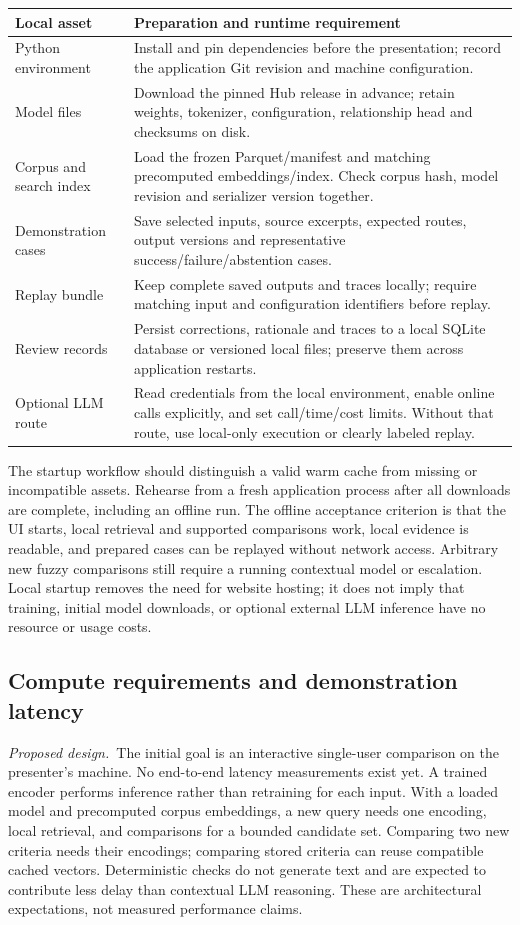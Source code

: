 \documentclass[10pt,letterpaper]{article}
\newcommand{\planned}{\textit{Proposed design.}}
\begin{document}
\begin{longtable}{L{.25\linewidth}L{.66\linewidth}}
\toprule Local asset & Preparation and runtime requirement\\\midrule
\endhead
Python environment & Install and pin dependencies before the presentation; record the application Git revision and machine configuration.\\
Model files & Download the pinned Hub release in advance; retain weights, tokenizer, configuration, relationship head and checksums on disk.\\
Corpus and search index & Load the frozen Parquet/manifest and matching precomputed embeddings/index. Check corpus hash, model revision and serializer version together.\\
Demonstration cases & Save selected inputs, source excerpts, expected routes, output versions and representative success/failure/abstention cases.\\
Replay bundle & Keep complete saved outputs and traces locally; require matching input and configuration identifiers before replay.\\
Review records & Persist corrections, rationale and traces to a local SQLite database or versioned local files; preserve them across application restarts.\\
Optional LLM route & Read credentials from the local environment, enable online calls explicitly, and set call/time/cost limits. Without that route, use local-only execution or clearly labeled replay.\\\bottomrule
\end{longtable}

The startup workflow should distinguish a valid warm cache from missing or
incompatible assets. Rehearse from a fresh application process after all
downloads are complete, including an offline run. The offline acceptance
criterion is that the UI starts, local retrieval and supported comparisons
work, local evidence is readable, and prepared cases can be replayed without
network access. Arbitrary new fuzzy comparisons still require a running
contextual model or escalation. Local startup removes the need for website
hosting; it does not imply that training, initial model downloads, or optional
external LLM inference have no resource or usage costs.

\subsection{Compute requirements and demonstration latency}
\label{sec:demolatency}
\planned\ The initial goal is an interactive single-user comparison on the
presenter's machine. No end-to-end latency measurements exist yet. A trained
encoder performs inference rather than retraining for each input. With a
loaded model and precomputed corpus embeddings, a new query needs one
encoding, local retrieval, and comparisons for a bounded candidate set.
Comparing two new criteria needs their encodings; comparing stored criteria
can reuse compatible cached vectors. Deterministic checks do not generate
text and are expected to contribute less delay than contextual LLM reasoning.
These are architectural expectations, not measured performance claims.
\end{document}
